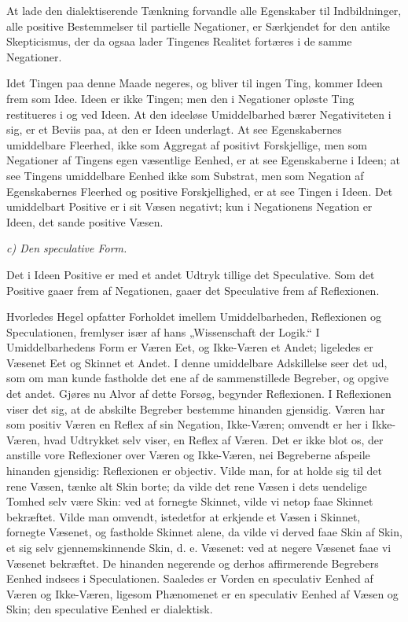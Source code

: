 \documentclass[12pt]{book}
\newcommand{\opage}[1]{\marginnote{\footnotesize\textit{[#1]}}}
\begin{document}
At lade den dialektiserende Tænkning forvandle alle Egenskaber til Indbildninger, alle positive
Bestemmelser til partielle Negationer, er Særkjendet for den antike Skepticismus, der da ogsaa
lader Tingenes Realitet fortæres i de samme Negationer.

Idet Tingen paa denne Maade negeres, og bliver til ingen Ting, kommer Ideen frem som Idee. Ideen
er ikke Tingen; men den i Negationer opløste Ting restitueres i og ved Ideen. At den ideeløse
Umiddelbarhed bærer Negativiteten i sig, er et Beviis paa, at den er Ideen underlagt. At see
Egenskabernes umiddelbare Fleerhed, ikke som Aggregat af positivt Forskjellige, men som Negationer
af Tingens egen væsentlige Eenhed, er at see Egenskaberne i Ideen; at see Tingens umiddelbare
Eenhed ikke som Substrat, men som Negation af Egenskabernes Fleerhed og positive Forskjellighed,
er at see Tingen i Ideen. Det umiddelbart Positive er i sit Væsen negativt; kun i Negationens
Negation er Ideen, det sande positive Væsen.

\emph{c) Den speculative Form.}

Det i Ideen Positive er med et andet Udtryk tillige det Speculative. Som det Positive gaaer frem af
Negationen, gaaer det Speculative frem af Reflexionen.

Hvorledes Hegel opfatter Forholdet imellem Umiddelbarheden, Reflexionen og Speculationen, fremlyser
især af hans „Wissenschaft der Logik.“ I Umiddelbarhedens Form er Væren Eet, og Ikke-Væren et
Andet; ligeledes er Væsenet Eet og Skinnet et Andet. I denne umiddelbare Adskillelse seer det ud,
som om man kunde fastholde det ene af de sammenstillede Begreber, og opgive det andet. Gjøres nu
Alvor
\opage{156} af dette Forsøg, begynder Reflexionen. I Reflexionen viser det sig, at de abskilte Begreber
bestemme hinanden gjensidig. Væren har som positiv Væren en Reflex af sin Negation, Ikke-Væren;
omvendt er her i Ikke-Væren, hvad Udtrykket selv viser, en Reflex af Væren. Det er ikke blot os,
der anstille vore Reflexioner over Væren og Ikke-Væren, nei Begreberne afspeile hinanden gjensidig:
Reflexionen er objectiv. Vilde man, for at holde sig til det rene Væsen, tænke alt Skin borte; da
vilde det rene Væsen i dets uendelige Tomhed selv være Skin: ved at fornegte Skinnet, vilde vi
netop faae Skinnet bekræftet. Vilde man omvendt, istedetfor at erkjende et Væsen i Skinnet,
fornegte Væsenet, og fastholde Skinnet alene, da vilde vi derved faae Skin af Skin, et sig selv
gjennemskinnende Skin, d. e. Væsenet: ved at negere Væsenet faae vi Væsenet bekræftet. De
hinanden negerende og derhos affirmerende Begrebers Eenhed indsees i Speculationen. Saaledes er
Vorden en speculativ Eenhed af Væren og Ikke-Væren, ligesom Phænomenet er en speculativ Eenhed af
Væsen og Skin; den speculative Eenhed er dialektisk.
\end{document}
